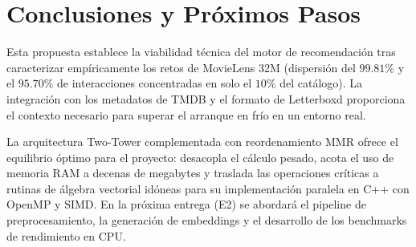 \documentclass[a4paper,11pt]{article}
\begin{document}
\section{Conclusiones y Próximos Pasos}

Esta propuesta establece la viabilidad técnica del motor de recomendación tras caracterizar empíricamente los retos de MovieLens 32M (dispersión del $99.81\%$ y el $95.70\%$ de interacciones concentradas en solo el $10\%$ del catálogo). La integración con los metadatos de TMDB y el formato de Letterboxd proporciona el contexto necesario para superar el arranque en frío en un entorno real.

La arquitectura Two-Tower complementada con reordenamiento MMR ofrece el equilibrio óptimo para el proyecto: desacopla el cálculo pesado, acota el uso de memoria RAM a decenas de megabytes y traslada las operaciones críticas a rutinas de álgebra vectorial idóneas para su implementación paralela en C++ con OpenMP y SIMD. En la próxima entrega (E2) se abordará el pipeline de preprocesamiento, la generación de embeddings y el desarrollo de los benchmarks de rendimiento en CPU.
\end{document}
